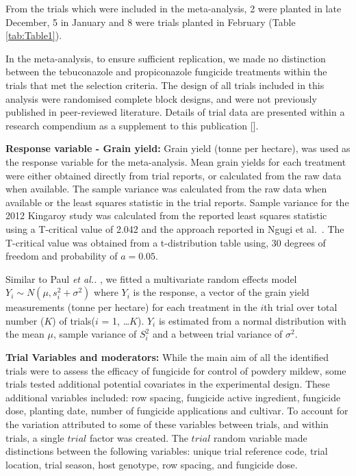 \documentclass[agronomy,article,submit,moreauthors,pdftex]{mdpi}
\begin{document}
From the trials which were included in the meta-analysis, 2 were planted in late December, 5 in January and 8 were trials planted in February (Table \ref{tab:Table1}).

In the meta-analysis, to ensure sufficient replication, we made no distinction between the tebuconazole and propiconazole fungicide treatments within the trials that met the selection criteria.
The design of all trials included in this analysis were randomised complete block designs, and were not previously published in peer-reviewed literature.
Details of trial data are presented within a research compendium as a supplement to this publication {[}{]}.

\textbf{Response variable - Grain yield: }
Grain yield (tonne per hectare), was used as the response variable for the meta-analysis.
Mean grain yields for each treatment were either obtained directly from trial reports, or calculated from the raw data when available.
The sample variance was calculated from the raw data when available or the least squares statistic in the trial reports.
Sample variance for the 2012 Kingaroy study was calculated from the reported least squares statistic using a T-critical value of 2.042 and the approach reported in Ngugi et al.~\citeyearpar{Ngugi2011}.
The T-critical value was obtained from a t-distribution table using, 30 degrees of freedom and probability of \(a = 0.05\).

Similar to Paul \emph{et al..} \citeyearpar{Paul2007}, we fitted a multivariate random effects model
\(Y_i \sim N(\mu,s_i^2 + \sigma^2)\)
where \(Y_i\) is the response, a vector of the grain yield measurements (tonne per hectare) for each treatment in the \(i\)th trial over total number (\(K\)) of trials(\(i\) = 1, \ldots{}\(K\)).
\(Y_i\) is estimated from a normal distribution with the mean \(\mu\), sample variance of \(S_i^2\) and a between trial variance of \(\sigma^2\).

\textbf{Trial Variables and moderators: }
While the main aim of all the identified trials were to assess the efficacy of fungicide for control of powdery mildew, some trials tested additional potential covariates in the experimental design.
These additional variables included: row spacing, fungicide active ingredient, fungicide dose, planting date, number of fungicide applications and cultivar.
To account for the variation attributed to some of these variables between trials, and within trials, a single \(trial\) factor was created.
The \(trial\) random variable made distinctions between the following variables: unique trial reference code, trial location, trial season, host genotype, row spacing, and fungicide dose.
\end{document}
